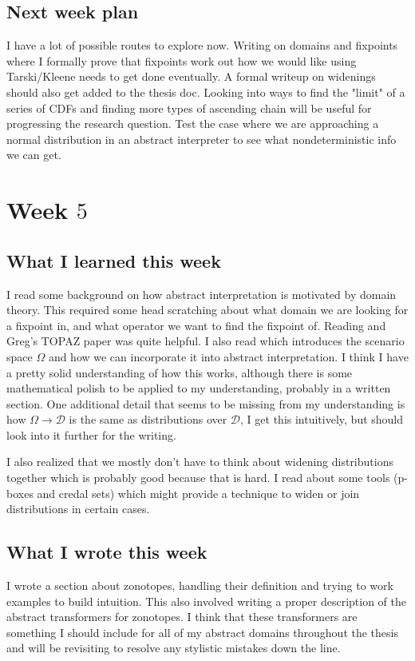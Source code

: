 \documentclass{amsart}
\newcommand{\cD}{\mathcal{D}}
\begin{document}
\subsection{Next week plan}
I have a lot of possible routes to explore now.
Writing on domains and fixpoints where I formally prove that fixpoints work out how we would like using Tarski/Kleene needs to get done eventually.
A formal writeup on widenings should also get added to the thesis doc.
Looking into ways to find the "limit" of a series of CDFs and finding more types of ascending chain will be useful for progressing the research question.
Test the case where we are approaching a normal distribution in an abstract interpreter to see what nondeterministic info we can get.

\section{Week $5$}

\subsection{What I learned this week}
I read some background on how abstract interpretation is motivated by domain theory.
This required some head scratching about what domain we are looking for a fixpoint in, and what operator we want to find the fixpoint of.
Reading \cite{AbstractInterpretationLatticeModel} and Greg's TOPAZ paper was quite helpful.
I also read \cite{CousotProbabilistic} which introduces the scenario space $\Omega$ and how we can incorporate it into abstract interpretation.
I think I have a pretty solid understanding of how this works, although there is some mathematical polish to be applied to my understanding, probably in a written section.
One additional detail that seems to be missing from my understanding is how $\Omega \to \cD$ is the same as distributions over $\cD$, I get this intuitively, but should look into it further for the writing.

I also realized that we mostly don't have to think about widening distributions together which is probably good because that is hard.
I read about some tools (p-boxes and credal sets) which might provide a technique to widen or join distributions in certain cases.

\subsection{What I wrote this week}
I wrote a section about zonotopes, handling their definition and trying to work examples to build intuition.
This also involved writing a proper description of the abstract transformers for zonotopes.
I think that these transformers are something I should include for all of my abstract domains throughout the thesis and will be revisiting to resolve any stylistic mistakes down the line.
\end{document}
